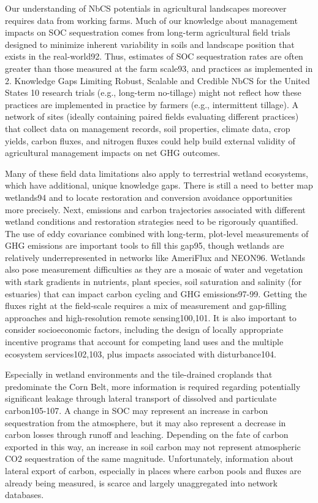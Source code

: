 \documentclass[
  letterpaper,
  DIV=11,
  numbers=noendperiod]{scrreprt}
\begin{document}
Our understanding of NbCS potentials in agricultural landscapes moreover
requires data from working farms. Much of our knowledge about management
impacts on SOC sequestration comes from long-term agricultural field
trials designed to minimize inherent variability in soils and landscape
position that exists in the real-world92. Thus, estimates of SOC
sequestration rates are often greater than those measured at the farm
scale93, and practices as implemented in 2. Knowledge Gaps Limiting
Robust, Scalable and Credible NbCS for the United States 10 research
trials (e.g., long-term no-tillage) might not reflect how these
practices are implemented in practice by farmers (e.g., intermittent
tillage). A network of sites (ideally containing paired fields
evaluating different practices) that collect data on management records,
soil properties, climate data, crop yields, carbon fluxes, and nitrogen
fluxes could help build external validity of agricultural management
impacts on net GHG outcomes.

Many of these field data limitations also apply to terrestrial wetland
ecosystems, which have additional, unique knowledge gaps. There is still
a need to better map wetlands94 and to locate restoration and conversion
avoidance opportunities more precisely. Next, emissions and carbon
trajectories associated with different wetland conditions and
restoration strategies need to be rigorously quantified. The use of eddy
covariance combined with long-term, plot-level measurements of GHG
emissions are important tools to fill this gap95, though wetlands are
relatively underrepresented in networks like AmeriFlux and NEON96.
Wetlands also pose measurement difficulties as they are a mosaic of
water and vegetation with stark gradients in nutrients, plant species,
soil saturation and salinity (for estuaries) that can impact carbon
cycling and GHG emissions97-99. Getting the fluxes right at the
field-scale requires a mix of measurement and gap-filling approaches and
high-resolution remote sensing100,101. It is also important to consider
socioeconomic factors, including the design of locally appropriate
incentive programs that account for competing land uses and the multiple
ecosystem services102,103, plus impacts associated with disturbance104.

Especially in wetland environments and the tile-drained croplands that
predominate the Corn Belt, more information is required regarding
potentially significant leakage through lateral transport of dissolved
and particulate carbon105-107. A change in SOC may represent an increase
in carbon sequestration from the atmosphere, but it may also represent a
decrease in carbon losses through runoff and leaching. Depending on the
fate of carbon exported in this way, an increase in soil carbon may not
represent atmospheric CO2 sequestration of the same magnitude.
Unfortunately, information about lateral export of carbon, especially in
places where carbon pools and fluxes are already being measured, is
scarce and largely unaggregated into network databases.
\end{document}
